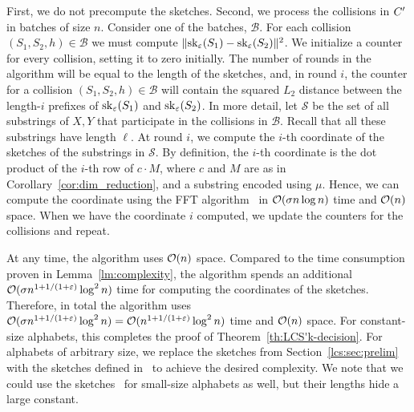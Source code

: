First, we do not precompute the sketches. Second, we process the collisions in $C'$ in batches of size $n$. Consider one of the batches, $\mathcal{B}$. For each collision $(S_1,S_2, h) \in \mathcal{B}$ we must compute $\lVert\mathrm{sk}_\varepsilon(S_1) - \mathrm{sk}_\varepsilon(S_2)\rVert^2$. 
We initialize a counter for every collision, setting it to zero initially. The number of rounds in the algorithm will be equal to the length of the sketches, and, in round $i$, the counter for a collision $(S_1, S_2, h) \in \mathcal{B}$ will contain the squared $L_2$ distance between the length-$i$ prefixes of $\mathrm{sk}_\varepsilon(S_1)$ and $\mathrm{sk}_\varepsilon(S_2)$. In more detail, let $\mathcal{S}$ be the set of all substrings of $X, Y$ that participate in the collisions in $\mathcal{B}$. Recall that all these substrings have length $\ell$. At round $i$, we compute the $i$-th coordinate of the sketches of the substrings in $\mathcal{S}$. By definition, the $i$-th coordinate is the dot product of the $i$-th row of $c \cdot M$, where $c$ and $M$ are as in Corollary~\ref{cor:dim_reduction}, and a substring encoded using $\mu$. Hence, we can compute the coordinate using the FFT algorithm~\cite{FischerPaterson} in $\mathcal{O}(\sigma n \log n)$ time and $\mathcal{O}(n)$ space. When we have the coordinate $i$ computed, we update the counters for the collisions and repeat.

At any time, the algorithm uses $\mathcal{O}(n)$ space.
Compared to the time consumption proven in Lemma~\ref{lm:complexity}, the algorithm spends an additional $\mathcal{O}(\sigma n^{1+1/(1+\varepsilon)} \log^2 n)$ time for computing the coordinates of the sketches.
Therefore, in total the algorithm uses $\mathcal{O}(\sigma n^{1+1/(1+\varepsilon)} \log^2 n) = \mathcal{O}(n^{1+1/(1+\varepsilon)} \log^2 n)$ time and $\mathcal{O}(n)$ space. 
For constant-size alphabets, this completes the proof of Theorem~\ref{th:LCS'k-decision}. For alphabets of arbitrary size, we replace the sketches from Section~\ref{lcs:sec:prelim} with the sketches defined in~\cite{DBLP:journals/algorithmica/KociumakaRS19} to achieve the desired complexity.
We note that we could use the sketches~\cite{DBLP:journals/algorithmica/KociumakaRS19} for small-size alphabets as well, but their lengths hide a large constant. 



